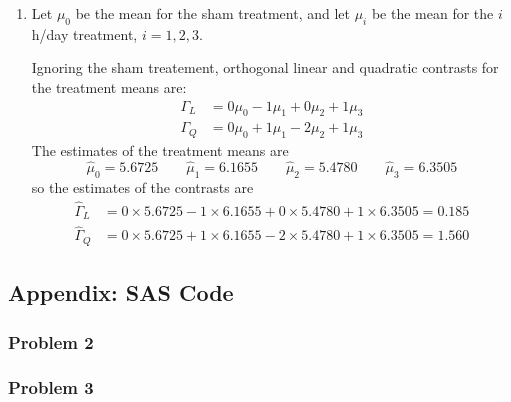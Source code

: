 \documentclass[11pt]{article}
\begin{document}
\begin{enumerate}
\item %
Let \(\mu_0\) be the mean for the sham treatment, and let \(\mu_i\)
be the mean for the \(i\) h/day treatment, \(i=1, 2, 3\).

Ignoring the sham treatement, orthogonal linear and quadratic contrasts for the
treatment means are:
\begin{align*}
\Gamma_L&=0\mu_0-1\mu_1+0\mu_2+1\mu_3\\
\Gamma_Q&=0\mu_0+1\mu_1-2\mu_2+1\mu_3
\end{align*}
The estimates of the treatment means are
\begin{equation*}
\widehat\mu_0=5.6725\qquad\widehat\mu_1=6.1655\qquad\widehat\mu_2=5.4780\qquad\widehat\mu_3=6.3505
\end{equation*}
so the estimates of the contrasts are
\begin{align*}
\widehat\Gamma_L&=0\times 5.6725-1\times 6.1655+0\times 5.4780+1\times 6.3505=0.185\\
\widehat\Gamma_Q&=0\times 5.6725+1\times 6.1655-2\times 5.4780+1\times 6.3505=1.560
\end{align*}

\end{enumerate}

\pagebreak
\subsection*{Appendix: SAS Code}

\subsubsection*{Problem 2}



\subsubsection*{Problem 3}


\end{document}
